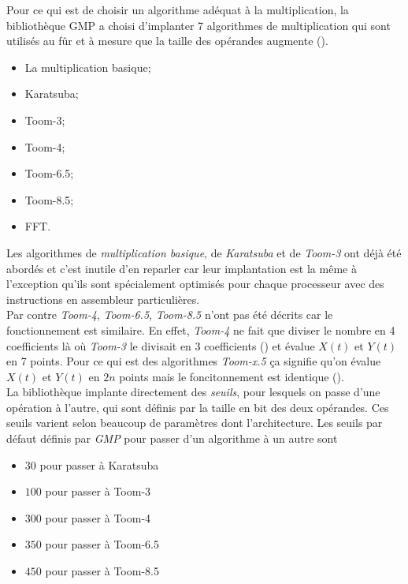 \documentclass[letterpaper]{article}
\begin{document}
Pour ce qui est de choisir un algorithme adéquat à la multiplication,
la bibliothèque GMP a choisi d'implanter 7 algorithmes de multiplication
qui sont utilisés au fûr et à mesure que la taille des opérandes
augmente (\cite{gmplibmultiplication}).

\begin{itemize}
  \item La multiplication basique;
  \item Karatsuba;
  \item Toom-3;
  \item Toom-4;
  \item Toom-6.5;
  \item Toom-8.5;
  \item FFT.
\end{itemize}

Les algorithmes de \emph{multiplication basique}, de \emph{Karatsuba} et de
\emph{Toom-3} ont déjà été abordés et c'est inutile d'en reparler car leur
implantation est la même à l'exception qu'ils sont spécialement optimisés pour
chaque processeur avec des instructions en assembleur particulières.\\

Par contre \emph{Toom-4}, \emph{Toom-6.5}, \emph{Toom-8.5} n'ont pas été
décrits car le fonctionnement est similaire. En effet, \emph{Toom-4} ne
fait que diviser le nombre en 4 coefficients là où \emph{Toom-3} le divisait en
3 coefficients (\cite{gmplibtoom4}) et évalue $X(t)$ et $Y(t)$ en 7 points.
Pour ce qui est des algorithmes \emph{Toom-x.5} ça signifie qu'on évalue $X(t)$
et $Y(t)$ en $2n$ points mais le foncitonnement est identique
(\cite{gmplibtoomhalf}).\\

La bibliothèque implante directement des \emph{seuils}, pour lesquels
on passe d'une opération à l'autre, qui sont définis par la taille en bit des
deux opérandes. Ces seuils varient selon beaucoup de paramètres dont
l'architecture. Les seuils par défaut définis par \emph{GMP} pour passer d'un
algorithme à un autre sont

\begin{itemize}
  \item $30$ pour passer à Karatsuba
  \item $100$ pour passer à Toom-3
  \item $300$ pour passer à Toom-4
  \item $350$ pour passer à Toom-6.5
  \item $450$ pour passer à Toom-8.5
\end{itemize}
\end{document}
